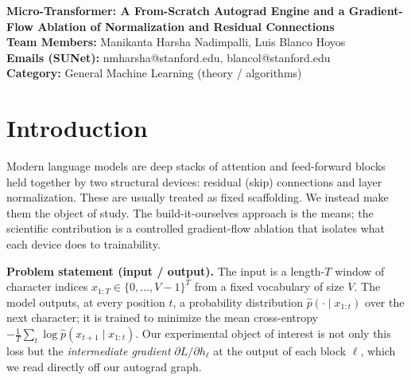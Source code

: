 \documentclass{article}
\makeatletter
\renewcommand{\maketitle}{
  \begin{center}
    {\bf \large Micro-Transformer: A From-Scratch Autograd Engine and a Gradient-Flow Ablation of Normalization and Residual Connections}\\
    \vspace{0.1cm}
    {\bf Team Members:} Manikanta Harsha Nadimpalli, Luis Blanco Hoyos\\
    \vspace{0.1cm}
    {\bf Emails (SUNet):} nmharsha@stanford.edu, blancol@stanford.edu\\
    \vspace{0.1cm}
    {\bf Category:} General Machine Learning (theory / algorithms)\\
    \vspace{0.2cm}
  \end{center}
}
\makeatother
\begin{document}
\maketitle

\begin{abstract}
\noindent We build a reverse-mode automatic-differentiation engine and a decoder-only transformer from scratch in NumPy, then use the engine as a measurement instrument to answer one question: \emph{how do LayerNorm placement (pre / post / none) and residual connections govern the gradient signal that reaches the early layers of a transformer during training?} Every layer is validated to machine precision against finite differences and a PyTorch oracle. Sweeping the six-cell grid (3 normalization placements $\times$ residual on/off) on character-level Tiny Shakespeare under a from-scratch AdamW optimizer, we find that the \textbf{residual connection — not normalization placement — is the dominant factor at this depth}: all three normalized variants \emph{with} residuals train to $\approx 1.8$ nats/char (beating a closed-form bigram floor by $0.6$--$0.7$ nats), while all three \emph{without} residuals collapse to $\approx 3.34$ nats as the gradient vanishes by one-to-four orders of magnitude toward the input (the no-norm/no-residual model has \emph{exactly zero} gradient in its first three layers). Pre- and post-norm differ only marginally once a residual is present.
\end{abstract}

\section{Introduction}
Modern language models are deep stacks of attention and feed-forward blocks held together by two structural devices: residual (skip) connections and layer normalization. These are usually treated as fixed scaffolding. We instead make them the object of study. The build-it-ourselves approach is the means; the scientific contribution is a controlled gradient-flow ablation that isolates what each device does to trainability.

\textbf{Problem statement (input / output).} The input is a length-$T$ window of character indices $x_{1:T}\in\{0,\dots,V-1\}^T$ from a fixed vocabulary of size $V$. The model outputs, at every position $t$, a probability distribution $\hat p(\cdot\mid x_{1:t})$ over the next character; it is trained to minimize the mean cross-entropy $-\tfrac1T\sum_t \log \hat p(x_{t+1}\mid x_{1:t})$. Our experimental object of interest is not only this loss but the \emph{intermediate gradient} $\partial L/\partial h_\ell$ at the output of each block $\ell$, which we read directly off our autograd graph.
\end{document}
